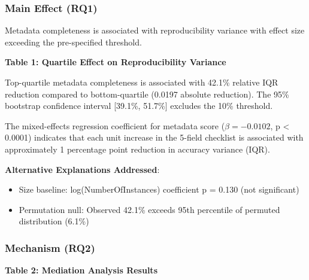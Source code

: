 
\subsubsection{Main Effect (RQ1)}

Metadata completeness is associated with reproducibility variance with effect size exceeding the pre-specified threshold.

\textbf{Table 1: Quartile Effect on Reproducibility Variance}

\begin{table}[htbp]
\centering
{}
\end{table}

Top-quartile metadata completeness is associated with 42.1\% relative IQR reduction compared to bottom-quartile (0.0197 absolute reduction). The 95\% bootstrap confidence interval [39.1\%, 51.7\%] excludes the 10\% threshold.

The mixed-effects regression coefficient for metadata score ($\beta = -0.0102$, p < 0.0001) indicates that each unit increase in the 5-field checklist is associated with approximately 1 percentage point reduction in accuracy variance (IQR).

\textbf{Alternative Explanations Addressed}:
\begin{itemize}
\item Size baseline: log(NumberOfInstances) coefficient p = 0.130 (not significant)
\item Permutation null: Observed 42.1\% exceeds 95th percentile of permuted distribution (6.1\%)
\end{itemize}

\subsubsection{Mechanism (RQ2)}

\textbf{Table 2: Mediation Analysis Results}

